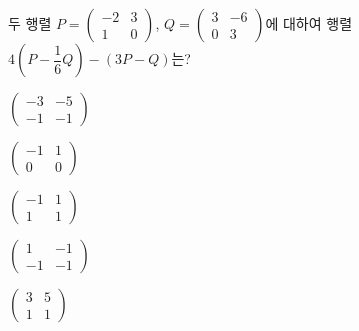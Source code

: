 두 행렬 $P=\begin{pmatrix} -2 & 3 \\ 1 & 0 \end{pmatrix}$, $Q=\begin{pmatrix} 3 & -6 \\ 0 & 3 \end{pmatrix}$에 대하여 행렬 $4\left(P-\dfrac{1}{6}Q\right)-(3P-Q)$는?
\begin{choicesii}{\rule[-3.0ex]{0pt}{8.0ex}$\begin{pmatrix} -3 & -5 \\ -1 & -1 \end{pmatrix}$}{\rule[-3.0ex]{0pt}{8.0ex}$\begin{pmatrix} -1 & 1 \\ 0 & 0 \end{pmatrix}$}{\rule[-3.0ex]{0pt}{8.0ex}$\begin{pmatrix} -1 & 1 \\ 1 & 1 \end{pmatrix}$}{\rule[-3.0ex]{0pt}{8.0ex}$\begin{pmatrix} 1 & -1 \\ -1 & -1 \end{pmatrix}$}{\rule[-3.0ex]{0pt}{8.0ex}$\begin{pmatrix} 3 & 5 \\ 1 & 1 \end{pmatrix}$}\end{choicesii}
